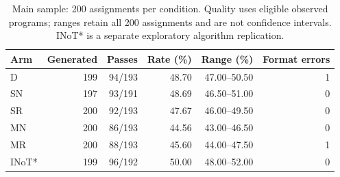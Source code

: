 \begin{table}[htbp]\centering\small
\caption{Main sample: 200 assignments per condition. Quality uses eligible observed programs; ranges retain all 200 assignments and are not confidence intervals. INoT* is a separate exploratory algorithm replication.}\label{tab:heldout-quality}
\begin{tabular}{lrrrrr}\toprule
Arm & Generated & Passes & Rate (\%) & Range (\%) & Format errors\\
\midrule
D & 199 & 94/193 & 48.70 & 47.00--50.50 & 1\\
SN & 197 & 93/191 & 48.69 & 46.50--51.00 & 0\\
SR & 200 & 92/193 & 47.67 & 46.00--49.50 & 0\\
MN & 200 & 86/193 & 44.56 & 43.00--46.50 & 0\\
MR & 200 & 88/193 & 45.60 & 44.00--47.50 & 1\\
INoT* & 199 & 96/192 & 50.00 & 48.00--52.00 & 0\\
\bottomrule\end{tabular}\end{table}
